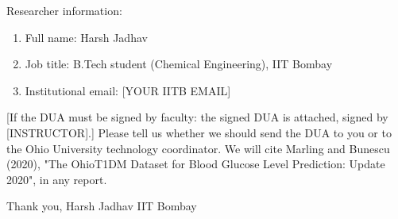 \documentclass[11pt,a4paper]{article}
\providecommand{\tightlist}{\setlength{\itemsep}{0pt}\setlength{\parskip}{0pt}}
\begin{document}
Researcher information:

\begin{enumerate}
\def\labelenumi{\arabic{enumi}.}
\tightlist
\item
  Full name: Harsh Jadhav
\item
  Job title: B.Tech student (Chemical Engineering), IIT Bombay
\item
  Institutional email: {[}YOUR IITB EMAIL{]}
\end{enumerate}

{[}If the DUA must be signed by faculty: the signed DUA is attached,
signed by {[}INSTRUCTOR{]}.{]} Please tell us whether we should send the
DUA to you or to the Ohio University technology coordinator. We will
cite Marling and Bunescu (2020), "The OhioT1DM Dataset for Blood Glucose
Level Prediction: Update 2020", in any report.

Thank you, Harsh Jadhav IIT Bombay
\end{document}
